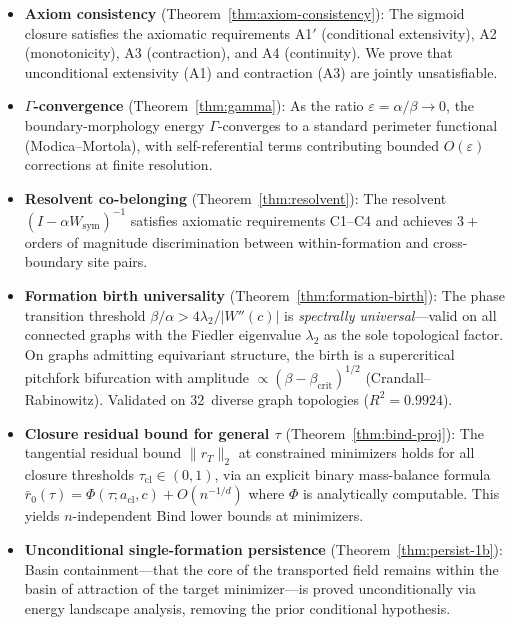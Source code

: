 \documentclass[lettersize,journal]{IEEEtran}
\begin{document}
\begin{itemize}
\item \textbf{Axiom consistency} (Theorem~\ref{thm:axiom-consistency}): The sigmoid closure satisfies the axiomatic requirements A1$'$ (conditional extensivity), A2 (monotonicity), A3 (contraction), and A4 (continuity). We prove that unconditional extensivity (A1) and contraction (A3) are jointly unsatisfiable.

\item \textbf{$\Gamma$-convergence} (Theorem~\ref{thm:gamma}): As the ratio $\varepsilon = \alpha/\beta \to 0$, the boundary-morphology energy $\Gamma$-converges to a standard perimeter functional (Modica--Mortola), with self-referential terms contributing bounded $O(\varepsilon)$ corrections at finite resolution.

\item \textbf{Resolvent co-belonging} (Theorem~\ref{thm:resolvent}): The resolvent $(I - \alpha W_{\mathrm{sym}})^{-1}$ satisfies axiomatic requirements C1--C4 and achieves $3+$ orders of magnitude discrimination between within-formation and cross-boundary site pairs.

\item \textbf{Formation birth universality} (Theorem~\ref{thm:formation-birth}): The phase transition threshold $\beta/\alpha > 4\lambda_2/|W''(c)|$ is \emph{spectrally universal}---valid on all connected graphs with the Fiedler eigenvalue $\lambda_2$ as the sole topological factor. On graphs admitting equivariant structure, the birth is a supercritical pitchfork bifurcation with amplitude $\propto (\beta - \beta_{\mathrm{crit}})^{1/2}$ (Crandall--Rabinowitz). Validated on 32~diverse graph topologies ($R^2 = 0.9924$).

\item \textbf{Closure residual bound for general $\tau$} (Theorem~\ref{thm:bind-proj}): The tangential residual bound $\|r_T\|_2$ at constrained minimizers holds for all closure thresholds $\tau_{\mathrm{cl}} \in (0,1)$, via an explicit binary mass-balance formula $\bar{r}_0(\tau) = \Phi(\tau; a_{\mathrm{cl}}, c) + O(n^{-1/d})$ where $\Phi$ is analytically computable. This yields $n$-independent Bind lower bounds at minimizers.

\item \textbf{Unconditional single-formation persistence} (Theorem~\ref{thm:persist-1b}): Basin containment---that the core of the transported field remains within the basin of attraction of the target minimizer---is proved unconditionally via energy landscape analysis, removing the prior conditional hypothesis.
\end{itemize}
\end{document}
